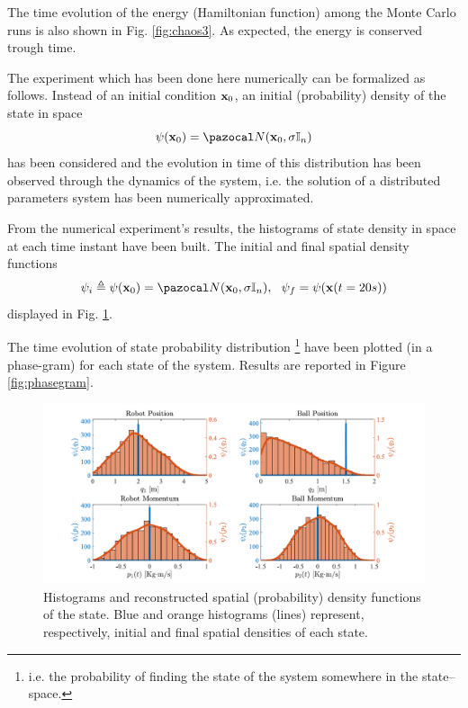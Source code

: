 The time evolution of the energy (Hamiltonian function) among the Monte Carlo runs is also shown in Fig. \ref{fig:chaos3}. As expected, the energy is conserved trough time.
%

%
The experiment which has been done here numerically can be formalized as follows.
Instead of an initial condition $\mathbf{x}_0$, an initial (probability) density of the state in space
%
\begin{equation}
\psi(\xb_0)=\N(\xb_0,\sigma\mathbb{I}_n)
\end{equation}
%
has been considered and the evolution in time of this distribution has been observed through the dynamics of the system, i.e. the solution of a distributed parameters system has been numerically approximated.
%

From the numerical experiment's results, the histograms of state density in space at each time instant have been built. 
The initial and final spatial density functions
%
\begin{equation}
\psi_i\triangleq\psi(\x_0)= \N(\xb_0,\sigma\mathbb{I}_n),~~ \psi_f = \psi(\xb(t = 20s))
\end{equation}
%
displayed in Fig. \ref{fig:hist}.

The time evolution of state probability distribution \footnote{i.e. the probability of finding the state of the system somewhere in the state--space.} have been plotted (in a phase-gram) for each state of the system. Results are reported in Figure \ref{fig:phasegram}. 

\begin{figure}[t!]
	\centering
	\includegraphics[width = 1\linewidth]{Figures/Hist.pdf}
	\caption[Histograms and reconstructed spatial (probability) density functions of the state]{Histograms and reconstructed spatial (probability) density functions of the state. Blue and orange histograms (lines) represent, respectively, initial and final spatial densities of each state.}
	\label{fig:hist}
\end{figure}

